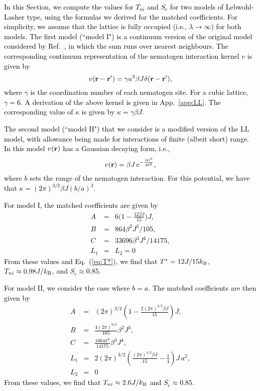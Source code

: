 \documentclass[jcp,aps,twocolumn,showpacs,supergroupedaddress,epsfig,amsmath,amssymb,eqsecnum]{revtex4}
\newcommand{\be}{\begin{equation}}
\newcommand{\ee}{\end{equation}}
\newcommand{\ba}{\begin{eqnarray}}
\newcommand{\ea}{\end{eqnarray}}
\newcommand{\rv}{{\bf r}}
\newcommand{\bing}[1]{\textcolor{black}{#1}}
\begin{document}
\bing{In this Section, we compute the values for $T_{ni}$ and $S_c$ for two models of Lebwohl-Lasher type, using the formulas we derived for the matched coefficients. For simplicity, we assume that the lattice is fully occupied (i.e., $\lambda \rightarrow \infty$) for both models. The first model (``model I") is a continuum version of the original model considered by Ref.~\cite{lebwohl-lasher1972}, in which the sum runs over nearest neighbours. The corresponding continuum representation of the nematogen interaction kernel $v$ is given by
\be
\label{eq:LLcont}
v(\rv - \rv') = \gamma a^3 \beta J \delta(\rv-\rv'), 
\ee
where $\gamma$ is the coordination number of each nematogen site. For a cubic lattice, $\gamma = 6$. A derivation of the above kernel is given in App.~\ref{app:LL}. The corresponding value of $\kappa$ is given by $\kappa = \gamma \beta J$.} 

\bing{The second model (``model II") that we consider is a modified version of the LL model, with allowance being made for interactions of finite (albeit short) range. In this model $v(\rv)$ has a Gaussian decaying form, i.e., 
\be
\label{eq:v-gaussian}
v(\rv) = \beta J \, {\rm e}^{-\frac{|\rv|^2}{2b^2}}, 
\ee
where $b$ sets the range of the nematogen interaction. For this potential, we have that $\kappa = (2\pi)^{3/2} \beta J (b/a)^3$.}

\bing{For model I, the matched coefficients are given by 
\begin{subequations}
\label{eq:matched-nn-full}
\ba
A &\!=\!& 6 \Big( 1 - \frac{12 \beta J}{15} \Big) J, 
\\
B &\!=\!& 864\beta^2 J^3/105,
\\
C &\!=\!& 33696 \beta^3 J^4/14175,
\\
L_1 &\!=\!& L_2 = 0
\ea
\end{subequations} 
From these values and Eq.~(\ref{eq:T*}), we find that $T^* = 12J/15k_{{\rm B}}$, $T_{ni} \approx 0.98 J/k_{{\rm B}}$, and $S_c \approx 0.85$.} 

\bing{For model II, we consider the case where $b = a$. The matched coefficients are then given by 
\begin{subequations}
\label{eq:occupy}
\ba
A &\!=\!& (2\pi)^{3/2} \left( 1 - \frac{2 (2\pi)^{3/2}\beta J}{15} \right) J,
\\
B &\!=\!& \frac{4(2\pi)^{9/2}}{105} \beta^2 J^3,
\\
C &\!=\!& \frac{1664 \pi^6}{14175} \beta^3 J^4,
\\
L_1 &\!=\!& 2 (2\pi)^{3/2} \left( \frac{(2\pi)^{3/2} \beta J}{15} 
- \frac{1}{4} \right) J \, a^2,
\\
L_2 &\!=\!& 0
\ea
\end{subequations}
From these values, we find that $T_{ni} \approx 2.6 J/k_{{\rm B}}$ and $S_c \approx 0.85$.} 
\end{document}
